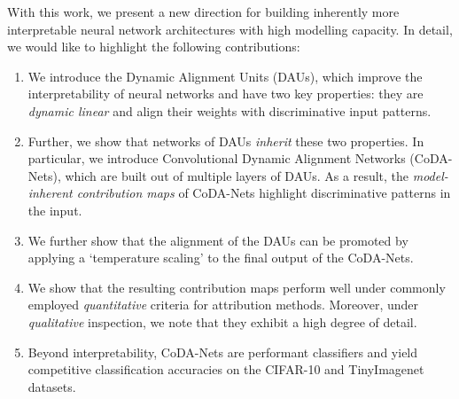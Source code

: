 With this work, we present a new direction for building inherently more interpretable neural network architectures with high modelling capacity.
In detail, we would like to highlight the following contributions:
\begin{enumerate}[wide, label={\textbf{(\arabic*)}}, itemsep=-.5em, topsep=0em, labelwidth=0em, labelindent=0pt]
    \item We introduce the Dynamic Alignment Units (DAUs), which 
    improve the interpretability of neural networks and have two key properties:
    they are 
    \emph{dynamic linear} 
    and align their weights with discriminative input patterns.
    \item Further, we show that networks of DAUs \emph{inherit} these two properties. In particular, we introduce Convolutional Dynamic Alignment Networks (CoDA-Nets), which are built out of multiple layers of DAUs. As a result, the \emph{model-inherent contribution maps} of CoDA-Nets highlight discriminative patterns in the input.
    \item We further show that the alignment of the DAUs can be promoted 
    by applying a `temperature scaling' to the final output of the CoDA-Nets. 
    \item We show that the resulting contribution maps 
    perform well under commonly employed \emph{quantitative} criteria for attribution methods. Moreover, under \emph{qualitative} inspection, we note that they exhibit a high degree of detail.
    \item Beyond interpretability, 
    CoDA-Nets are performant classifiers and yield competitive classification accuracies on the CIFAR-10 and TinyImagenet datasets.
\end{enumerate}